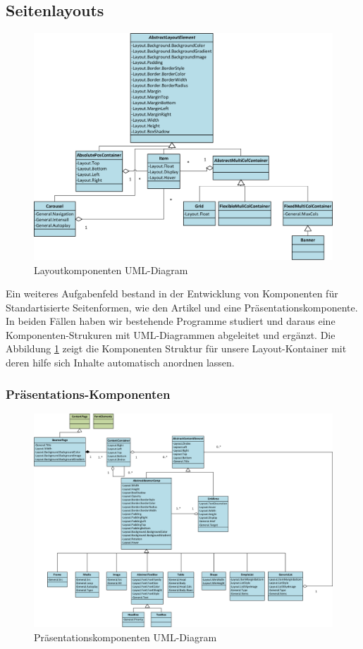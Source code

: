 \documentclass[12pt]{article}
\begin{document}
\subsection{Seitenlayouts}

\begin{figure}[h]
	\centering
	\includegraphics[width=1.0\textwidth]{Layout.png}
	\caption{Layoutkomponenten UML-Diagram}
	\label{fig:Layout}
\end{figure}

Ein weiteres Aufgabenfeld bestand in der Entwicklung von Komponenten für Standartisierte Seitenformen, wie den Artikel und
eine Präsentationskomponente. In beiden Fällen haben wir bestehende Programme studiert und daraus eine Komponenten-Strukuren
mit UML-Diagrammen abgeleitet und ergänzt. Die Abbildung \ref{fig:Layout} zeigt die Komponenten Struktur für unsere Layout-Kontainer mit deren
hilfe sich Inhalte automatisch anordnen lassen.

\subsubsection{Präsentations-Komponenten}

\begin{figure}[h]
	\centering
	\includegraphics[width=1.0\textwidth]{Beamer.png}
	\caption{Präsentationskomponenten UML-Diagram}
	\label{fig:Beamer}
\end{figure}
\end{document}
